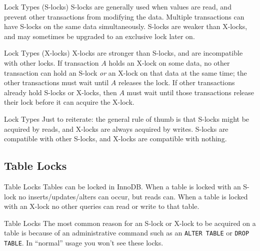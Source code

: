 \documentclass[14pt]{beamer}
\begin{document}
\begin{frame}{Lock Types (S-locks)}
  S-locks are generally used when values are read, and prevent other
  transactions from modifying the data. Multiple transactions can have S-locks
  on the same data simultaneously.
  \newline
  \newline
  S-locks are weaker than X-locks, and may sometimes be upgraded to
  an exclusive lock later on.
\end{frame}

\begin{frame}{Lock Types (X-locks)}
  X-locks are stronger than S-locks, and are incompatible with other locks. If
  transaction $A$ holds an X-lock on some data, no other transaction can hold an
  S-lock \emph{or} an X-lock on that data at the same time; the other
  transactions must wait until $A$ releases the lock.
  \newline
  \newline
  If other transactions already hold S-locks or X-locks, then $A$ must wait
  until those transactions release their lock before it can acquire the X-lock.
\end{frame}

\begin{frame}{Lock Types}
  Just to reiterate: the general rule of thumb is that S-locks might be acquired
  by reads, and X-locks are always acquired by writes. S-locks are compatible
  with other S-locks, and X-locks are compatible with nothing.
\end{frame}

\subsection{Table Locks}

\begin{frame}{Table Locks}
  Tables can be locked in InnoDB. When a table is locked with an S-lock no
  inserts/updates/alters can occur, but reads can.
  \newline
  \newline
  When a table is locked with an X-lock no other queries can read or write to
  that table.
\end{frame}

\begin{frame}{Table Locks}
  The most common reason for an S-lock or X-lock to be acquired on a table is
  because of an administrative command such as an \texttt{ALTER TABLE} or
  \texttt{DROP TABLE}.
  \newline
  \newline
  In ``normal'' usage you won't see these locks.
\end{frame}
\end{document}
